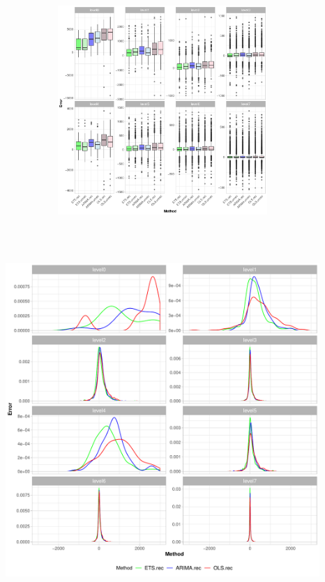 \documentclass[11pt,a4paper,]{article}
\let\origfigure\figure
\let\endorigfigure\endfigure
\renewenvironment{figure}[1][2] {
    \expandafter\origfigure\expandafter[htbp]
} {
    \endorigfigure
}
\begin{document}
\begin{figure}

{\centering \includegraphics[width=450px,height=300px]{Paper-Figures/results_Tourism/boxplot_24} 

}

\caption{Box plot for forecast errors - Reconciled and unreconciled ETS, ARIMA and OLS in each hierarchy level for 24-step-ahead tourism demand}\label{fig:boxplottourism}
\end{figure}

\begin{figure}

{\centering \includegraphics[width=450px,height=550px]{Paper-Figures/results_Tourism/densityplot_24} 

}

\caption{Density plot for forecast errors - Reconciled and unreconciled ETS, ARIMA and OLS in each hierarchy level for 24-step-ahead tourism demand using interval (-3000,3000)}\label{fig:densityplottourism}
\end{figure}
\end{document}
